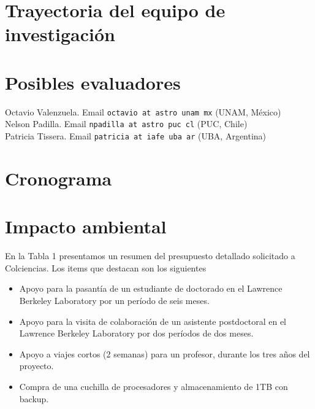 \documentclass[12pt]{article}
\begin{document}

\section{Trayectoria del equipo de investigaci\'on}


\section{Posibles evaluadores}

\noindent
Octavio Valenzuela. Email {\texttt{octavio at astro unam mx}} (UNAM, M\'exico)\\
Nelson Padilla. Email {\texttt{npadilla at astro puc cl}} (PUC, Chile)\\
Patricia Tissera. Email {\texttt{patricia at iafe uba ar}} (UBA, Argentina)\\

\section{Cronograma}

\section{Impacto ambiental}


En la Tabla 1 presentamos un resumen del presupuesto detallado
solicitado a Colciencias. Los items que destacan son los siguientes

\begin{itemize}

\item Apoyo para la pasant\'ia de un estudiante de doctorado en el
  Lawrence Berkeley Laboratory por un per\'iodo de seis meses.
\item Apoyo para la visita de colaboraci\'on de un asistente postdoctoral en el
  Lawrence Berkeley Laboratory por dos per\'iodos de dos meses.
\item Apoyo a viajes cortos (2 semanas) para un profesor, durante los
  tres a\~nos del proyecto. 
\item Compra de una cuchilla de procesadores y almacenamiento de 1TB
  con backup.
\end{itemize}
\end{document}
